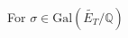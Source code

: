 \documentclass[preview]{standalone}
\begin{document}
\begin{center}
For $\sigma \in \text{Gal}\left(\widetilde{E_T}/\mathbb{Q}\right)$
\end{center}
\end{document}
